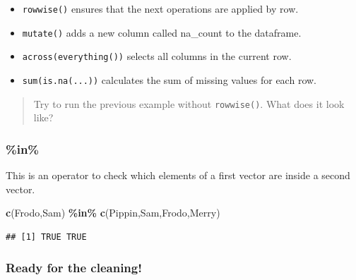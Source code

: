\documentclass[
]{book}
\newenvironment{Shaded}{\begin{snugshade}}{\end{snugshade}}
\newcommand{\FunctionTok}[1]{\textcolor[rgb]{0.13,0.29,0.53}{\textbf{#1}}}
\newcommand{\NormalTok}[1]{#1}
\newcommand{\SpecialCharTok}[1]{\textcolor[rgb]{0.81,0.36,0.00}{\textbf{#1}}}
\newcommand{\StringTok}[1]{\textcolor[rgb]{0.31,0.60,0.02}{#1}}
\providecommand{\tightlist}{%
  \setlength{\itemsep}{0pt}\setlength{\parskip}{0pt}}
\begin{document}
\begin{itemize}
\tightlist
\item
  \texttt{rowwise()} ensures that the next operations are applied by row.\\
\item
  \texttt{mutate()} adds a new column called na\_count to the dataframe.\\
\item
  \texttt{across(everything())} selects all columns in the current row.\\
\item
  \texttt{sum(is.na(...))} calculates the sum of missing values for each row.
\end{itemize}

\begin{quote}
Try to run the previous example without \texttt{rowwise()}. What does it look like?
\end{quote}

\hypertarget{in}{%
\subsubsection{\%in\%}\label{in}}

This is an operator to check which elements of a first vector are inside a second vector.

\begin{Shaded}
\begin{Highlighting}[]
\FunctionTok{c}\NormalTok{(}\StringTok{\textquotesingle{}Frodo\textquotesingle{}}\NormalTok{,}\StringTok{\textquotesingle{}Sam\textquotesingle{}}\NormalTok{) }\SpecialCharTok{\%in\%} \FunctionTok{c}\NormalTok{(}\StringTok{\textquotesingle{}Pippin\textquotesingle{}}\NormalTok{,}\StringTok{\textquotesingle{}Sam\textquotesingle{}}\NormalTok{,}\StringTok{\textquotesingle{}Frodo\textquotesingle{}}\NormalTok{,}\StringTok{\textquotesingle{}Merry\textquotesingle{}}\NormalTok{)}
\end{Highlighting}
\end{Shaded}

\begin{verbatim}
## [1] TRUE TRUE
\end{verbatim}

\hypertarget{ready-for-the-cleaning}{%
\subsubsection{Ready for the cleaning!}\label{ready-for-the-cleaning}}
\end{document}
